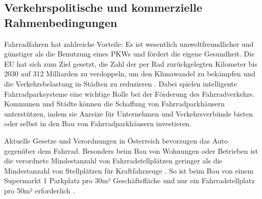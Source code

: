 \subsection{Verkehrspolitische und kommerzielle Rahmenbedingungen}

Fahrradfahren hat zahlreiche Vorteile: Es ist wesentlich umweltfreundlicher und günstiger als die Benutzung eines PKWs und fördert die eigene Gesundheit. Die EU hat sich zum Ziel gesetzt, die Zahl der per Rad zurückgelegten Kilometer bis 2030 auf 312 Milliarden zu verdoppeln, um den Klimawandel zu bekämpfen und die Verkehrsbelastung in Städten zu reduzieren . Dabei spielen intelligente Fahrradparksysteme eine wichtige Rolle bei der Förderung des Fahrradverkehrs. Kommunen und Städte können die Schaffung von Fahrradparkhäusern unterstützen, indem sie Anreize für Unternehmen und Verkehrsverbünde bieten oder selbst in den Bau von Fahrradparkhäusern investieren.

\smallskip \noindent Aktuelle Gesetze und Verordnungen in Österreich bevorzugen das Auto gegenüber dem Fahrrad. Besonders beim Bau von Wohnungen oder Betrieben ist die verordnete Mindestanzahl von Fahrradstellplätzen geringer als die Mindestanzahl von Stellplätzen für Kraftfahrzeuge . So ist beim Bau von einem Supermarkt 1 Parkplatz pro 30m² Geschäftsfläche und nur ein Fahrradstellplatz pro 50m² erforderlich .
